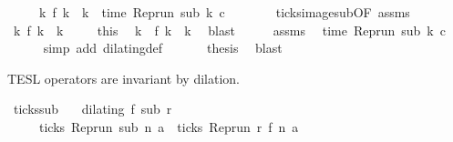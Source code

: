 \begin{isabellebody}
\ \ \ \ \ {\isacartoucheopen}{\isasymexists}k\ f\ k\ {\isacharequal}\ k\ {\isasymand}\ time\ {\isacharparenleft}{\isacharparenleft}Rep{\isacharunderscore}run\ sub{\isacharparenright}\ k\ c{\isacharparenright}\ {\isacharequal}\ {\isasymtau}{\isacartoucheclose}\isanewline
%
\isadelimproof
%
\endisadelimproof
%
\isatagproof
{}\isamarkupfalse%
\ {\isacharminus}\isanewline
\ \ \isamarkupfalse%
\ ticks{\isacharunderscore}image{\isacharunderscore}sub{\isacharprime}{\isacharbrackleft}OF\ assms{\isacharparenleft}{}{\isacharcomma}{}{\isacharparenright}{\isacharbrackright}\ \isamarkupfalse%
\ {\isacartoucheopen}{\isasymexists}k\ f\ k\ {\isacharequal}\ k{\isacartoucheclose}\ \isacommand{{\isachardot}}\isamarkupfalse%
\isanewline
\ \ \isamarkupfalse%
\ this\ \isamarkupfalse%
\ k\ \ {\isacartoucheopen}f\ k\ {\isacharequal}\ k{\isacartoucheclose}\ \isamarkupfalse%
\ blast\isanewline
\ \ \isamarkupfalse%
\ \isamarkupfalse%
\ assms{\isacharparenleft}{}{\isacharcomma}{}{\isacharparenright}\ \isamarkupfalse%
\ {\isacartoucheopen}time\ {\isacharparenleft}{\isacharparenleft}Rep{\isacharunderscore}run\ sub{\isacharparenright}\ k\ c{\isacharparenright}\ {\isacharequal}\ {\isasymtau}{\isacartoucheclose}\isanewline
\ \ \ \ \isamarkupfalse%
\ {\isacharparenleft}simp\ add{\isacharcolon}\ dilating{\isacharunderscore}def{\isacharparenright}\ \isanewline
\ \ \isamarkupfalse%
\ \isamarkupfalse%
\ {\isacharquery}thesis\ \isamarkupfalse%
\ blast\isanewline
{}\isamarkupfalse%
%
\endisatagproof
{\isafoldproof}%
%
\isadelimproof
%
\endisadelimproof
%
\begin{isamarkuptext}%
TESL operators are invariant by dilation.%
\end{isamarkuptext}\isamarkuptrue%
\isamarkupfalse%
\ ticks{\isacharunderscore}sub{\isacharcolon}\isanewline
\ \ \ {\isacartoucheopen}dilating\ f\ sub\ r{\isacartoucheclose}\isanewline
\ \ \ \ \ {\isacartoucheopen}ticks\ {\isacharparenleft}{\isacharparenleft}Rep{\isacharunderscore}run\ sub{\isacharparenright}\ n\ a{\isacharparenright}\ {\isacharequal}\ ticks\ {\isacharparenleft}{\isacharparenleft}Rep{\isacharunderscore}run\ r{\isacharparenright}\ {\isacharparenleft}f\ n{\isacharparenright}\ a{\isacharparenright}{\isacartoucheclose}\isanewline

\end{isabellebody}
